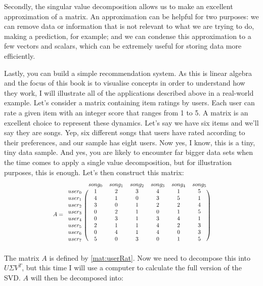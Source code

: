 \documentclass[600paper, 11pt,twoside,openany]{kdp}
\begin{document}
\par 
\vspace{-3pt}
\indent Secondly, the singular value decomposition allows us to make an excellent approximation of a matrix. An approximation can be helpful for two purposes: we can remove data or information that is not relevant to what we are trying to do, making a prediction, for example; and we can condense this approximation to a few vectors and scalars, which can be extremely useful for storing data more efficiently.
\par 
\vspace{-3pt}
\indent Lastly, you can build a simple recommendation system. As this is linear algebra and the focus of this book is to visualise concepts in order to understand how they work, I will illustrate all of the applications described above in a real-world example. Let’s consider a matrix containing item ratings by users. Each user can rate a given item with an integer score that ranges from 1 to 5. A matrix is an excellent choice to represent these dynamics. Let’s say we have six items and we’ll say they are songs. Yep, six different songs that users have rated according to their preferences, and our sample has eight users. Now yes, I know, this is a tiny, tiny data sample. And yes, you are likely to encounter far bigger data sets when the time comes to apply a single value decomposition, but for illustration purposes, this is enough. Let’s then construct this matrix:
\begin{equation}
\scalebox{.80}{$\displaystyle 
A =
 \begin{blockarray}{cccccccc}
& song_0 & song_1 & song_2 & song_3 & song_4 & song_5\\
\begin{block}{c(ccccccc)}
user_0 & 1 & 2 & 3 & 4 & 1 & 5\\
user_1 & 4 & 1 & 0 & 3 & 5 & 1\\
user_2 & 3 & 0 & 1 & 2 & 2 & 4\\
user_3 & 0 & 2 & 1 & 0 & 1 & 5\\
user_4 & 0 & 3 & 1 & 3 & 4 & 1\\
user_5 & 2 & 1 & 1 & 4 & 2 & 3\\
user_6 & 0 & 4 & 1 & 4 & 0 & 3\\
user_7 & 5 & 0 & 3 & 0 & 1 & 5\\
\end{block}
\end{blockarray} \label{mat:userRat}$}
\end{equation}
\indent The matrix $A$ is defined by \ref{mat:userRat}. Now we need to decompose this into $U \Sigma V^T$, but this time I will use a computer to calculate the full version of the SVD. $A$ will then be decomposed into:
\end{document}
